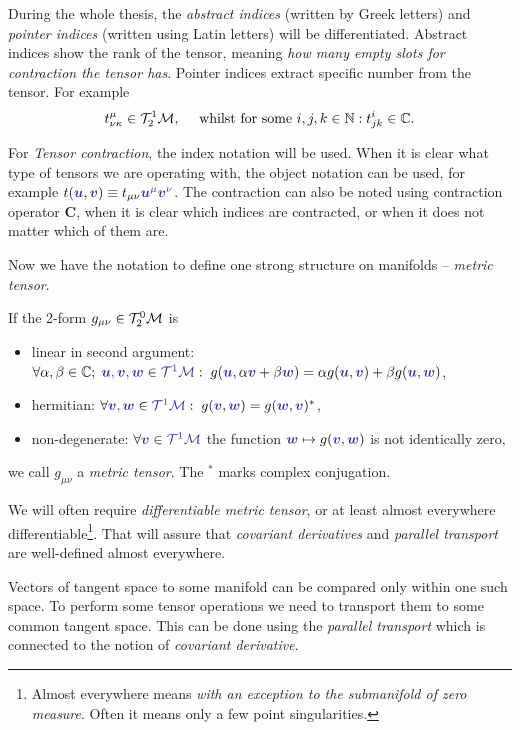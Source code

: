 During the whole thesis, the \emph{abstract indices} (written by Greek letters) and \emph{pointer indices} (written using Latin letters) will be differentiated. Abstract indices show the rank of the tensor, meaning \emph{how many empty slots for contraction the tensor has}. Pointer indices extract specific number from the tensor. For example
$$t^\mu_{\nu\kappa} \in \mathcal{T}^1_2\mathcal{M}, \quad \text{ whilst for some }i,j,k\in\mathbb{N}: t^i_{jk}\in \mathbb C.$$

For \emph{Tensor contraction}, the index notation will be used. When it is clear what type of tensors we are operating with, the object notation can be used, for example $t(\bluee{\bm u},\bluee{\bm v})\equiv t_{\mu\nu}\bluee{\bm u^\mu \bm v^\nu}$. The contraction can also be noted using contraction operator $\mathbf C$, when it is clear which indices are contracted, or when it does not matter which of them are.

Now we have the notation to define one strong structure on manifolds -- \emph{metric tensor}. 
\begin{definition}
If the 2-form $g_{\mu\nu}\in\mathcal{T}^0_2\mathcal{M}$ is
\begin{itemize}
    \item linear in second argument: $\forall \alpha,\beta\in\C;\; \bluee{\bm u,\bm v,\bm w}\in \bluee{\TT^1\M}: \; g(\bluee{\bm u},\alpha\bluee{\bm v}+\beta \bluee{\bm w}) = \alpha g(\bluee{\bm u},\bluee{\bm v})+\beta g(\bluee{\bm u},\bluee{\bm w})$,
    \item hermitian: $\forall \bluee{\bm v,\bm w}\in \bluee{\TT^1\M}: \; g(\bluee{\bm v},\bluee{\bm w})=g(\bluee{\bm w},\bluee{\bm v})^*$,
    \item non-degenerate: $\forall \bluee{\bm v}\in\bluee{\TT^1\M}$ the function $\bluee{\bm w}\mapsto g(\bluee{\bm v},\bluee{\bm w})$ is not identically zero,
\end{itemize} 
we call $g_{\mu\nu}$ a \emph{metric tensor}. The $^*$ marks complex conjugation.
\end{definition}

We will often require \emph{differentiable metric tensor}, or at least almost everywhere differentiable\footnote{Almost everywhere means \emph{with an exception to the submanifold of zero measure}. Often it means only a few point singularities.}. That will assure that \emph{covariant derivatives} and \emph{parallel transport} are well-defined almost everywhere. 




Vectors of tangent space to some manifold can be compared only within one such space. To perform some tensor operations we need to transport them to some common tangent space. This can be done using the \emph{parallel transport} which is connected to the notion of \emph{covariant derivative}.

